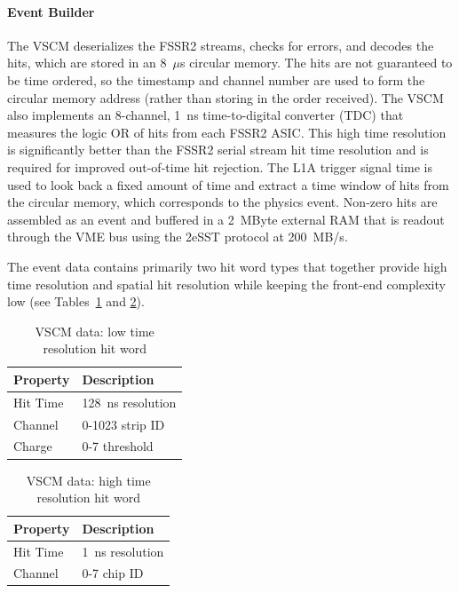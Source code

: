 \paragraph{Event Builder}
The VSCM deserializes the FSSR2 streams, checks for errors, and decodes the hits, which are stored in an 8~$\mu$s circular memory. The hits are not guaranteed to be time ordered, so the timestamp and channel number are used to form the circular memory address (rather than storing in the order received). The VSCM also implements an 8-channel, 1~ns time-to-digital converter (TDC) that measures the logic OR of hits from each FSSR2 ASIC. This high time resolution is significantly better than the FSSR2 serial stream hit time resolution and is required for improved out-of-time hit rejection. The L1A trigger signal time is used to look back a fixed amount of time and extract a time window of hits from the circular memory, which corresponds to the physics event. Non-zero hits are assembled as an event and buffered in a 2~MByte external RAM that is readout through the VME bus using the 2eSST protocol at 200~MB/s.

The event data contains primarily two hit word types that together provide high time resolution and spatial hit resolution while keeping the front-end complexity low (see Tables~\ref{tab:vscm_low_res} and \ref{tab:vscm_high_res}).
\begin{table}
\begin{center}
	\begin{tabular}{| l | l |}
		\hline \hline
		Property	& Description		\\
		\hline
		Hit Time	& 128~ns resolution	\\
		Channel		& 0-1023 strip ID	\\
		Charge		& 0-7 threshold		\\
		\hline \hline
	\end{tabular}
	\caption{VSCM data: low time resolution hit word}
	\label{tab:vscm_low_res}
\end{center}
\end{table}

\begin{table}
\begin{center}
	\begin{tabular}{| l | l |}
		\hline \hline
		Property	& Description		\\
		\hline
		Hit Time	& 1~ns resolution	\\
		Channel		& 0-7 chip ID		\\
		\hline \hline
	\end{tabular}
	\caption{VSCM data: high time resolution hit word}
	\label{tab:vscm_high_res}
\end{center}
\end{table}

